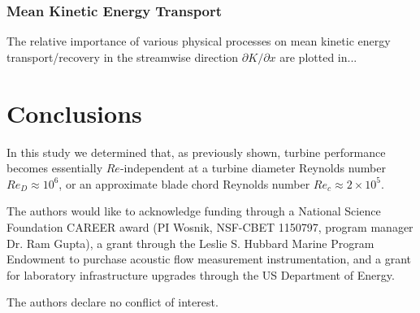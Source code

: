 \documentclass[energies,article,accept,moreauthors,pdftex,12pt,a4paper]{mdpi}
\def \p{\partial}
\begin{document}


\subsubsection{Mean Kinetic Energy Transport}

The relative importance of various physical processes on mean kinetic energy
transport/recovery in the streamwise direction $\p K / \p x$ are plotted in...



\section{Conclusions}

In this study we determined that, as previously shown, turbine performance
becomes essentially $Re$-independent at a turbine diameter Reynolds number $Re_D
\approx 10^6$, or an approximate blade chord Reynolds number $Re_c \approx 2
\times 10^5$.



The authors would like to acknowledge funding through a National Science
Foundation CAREER award (PI Wosnik, NSF-CBET 1150797, program manager Dr. Ram
Gupta), a grant through the Leslie S. Hubbard Marine Program Endowment to
purchase acoustic flow measurement instrumentation, and a grant for laboratory
infrastructure upgrades through the US Department of Energy.


The authors declare no conflict of interest.




\end{document}
